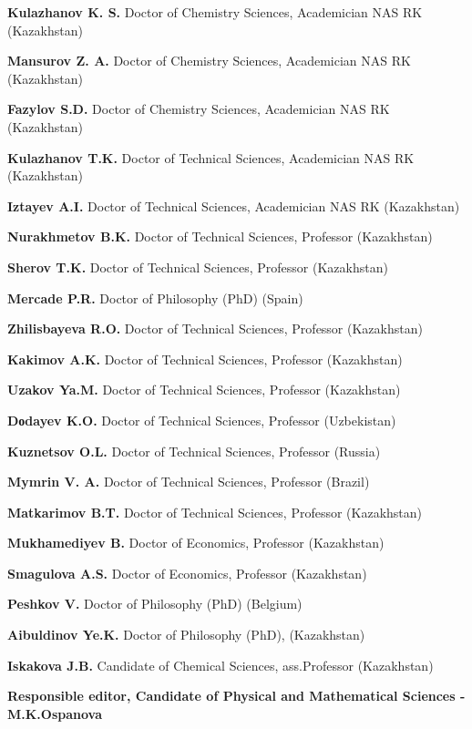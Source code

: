 {\bfseries Kulazhanov K. S.} Doctor of Chemistry Sciences, Academician NAS
RK (Kazakhstan)

{\bfseries Mansurov Z. A.} Doctor of Chemistry Sciences, Academician NAS RK
(Kazakhstan)

{\bfseries Fazylov S.D.} Doctor of Chemistry Sciences, Academician NAS RK
(Kazakhstan)

{\bfseries Kulazhanov T.K.} Doctor of Technical Sciences, Academician NAS
RK (Kazakhstan)

{\bfseries Iztayev A.I.} Doctor of Technical Sciences, Academician NAS RK
(Kazakhstan)

{\bfseries Nurakhmetov B.K.} Doctor of Technical Sciences, Professor
(Kazakhstan)

{\bfseries Sherov T.K.} Doctor of Technical Sciences, Professor
(Kazakhstan)

{\bfseries Mercade P.R.} Doctor of Philosophy (PhD) (Spain)

{\bfseries Zhilisbayeva R.O.} Doctor of Technical Sciences, Professor
(Kazakhstan)

{\bfseries Kakimov A.K.} Doctor of Technical Sciences, Professor
(Kazakhstan)

{\bfseries Uzakov Ya.M.} Doctor of Technical Sciences, Professor
(Kazakhstan)

{\bfseries Dоdayev K.O.} Doctor of Technical Sciences, Professor
(Uzbekistan)

{\bfseries Kuznetsov O.L.} Doctor of Technical Sciences, Professor (Russia)

{\bfseries Mymrin V. A.} Doctor of Technical Sciences, Professor (Brazil)

{\bfseries Matkarimov B.T.} Doctor of Technical Sciences, Professor
(Kazakhstan)

{\bfseries Mukhamediyev B.} Doctor of Economics, Professor (Kazakhstan)

{\bfseries Smagulova A.S.} Doctor of Economics, Professor (Kazakhstan)

{\bfseries Peshkov V.} Doctor of Philosophy (PhD) (Belgium)

{\bfseries Aibuldinov Ye.K.} Doctor of Philosophy (PhD), (Kazakhstan)

{\bfseries Iskakova J.B.} Candidate of Chemical Sciences, ass.Professor
(Kazakhstan)

\begin{center}
{\bfseries Responsible editor, Candidate of Physical and Mathematical
Sciences -M.K.Ospanova}
\end{center}

